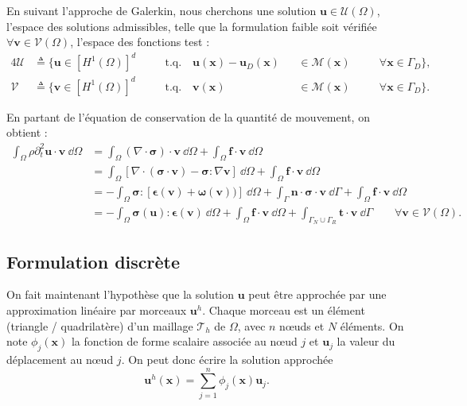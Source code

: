 \documentclass[12pt]{article}
\newcommand{\uu}{\mathbf{u}}
\newcommand{\vv}{\mathbf{v}}
\newcommand{\xx}{\mathbf{x}}
\newcommand{\stress}{\boldsymbol{\sigma}}
\newcommand{\strain}{\boldsymbol{\epsilon}}
\begin{document}
En suivant l'approche de Galerkin, nous cherchons une solution 
$\uu \in \mathcal{U}(\Omega)$, l'espace des solutions admissibles, 
telle que la formulation faible soit vérifiée 
$\forall \vv \in \mathcal{V}(\Omega)$, l’espace des fonctions test :
\begin{alignat}{4}
    \mathcal{U} &\triangleq \big\{ 
        \uu \in [H^1(\Omega)]^d \quad &&\text{t.q.} \quad 
        \uu(\xx) - \uu_D(\xx) &&\in \mathcal{M}(\xx) 
        \quad &&\forall \xx \in \Gamma_D
    \big\},\\
    \mathcal{V} &\triangleq \big\{ 
        \vv \in [H^1(\Omega)]^d \quad &&\text{t.q.} \quad 
        \vv(\xx) &&\in \mathcal{M}(\xx)
        \quad &&\forall \xx \in \Gamma_D
    \big\}.
\end{alignat}

En partant de l'équation de conservation de la quantité de mouvement, on
obtient :
\begin{equation}
    \begin{aligned}
        \int_\Omega \rho \partial^2_t \uu \cdot \vv \:\dd\Omega 
        &= 
        \int_\Omega (\nabla \cdot \stress) \cdot \vv \:\dd\Omega + 
        \int_\Omega \mathbf{f} \cdot \vv \:\dd\Omega\\
        &=
        \int_\Omega \left[\nabla \cdot (\stress \cdot \vv) 
        - \stress : \nabla \vv \right] \:\dd\Omega + 
        \int_\Omega \mathbf{f} \cdot \vv \:\dd\Omega\\
        &=
        -\int_\Omega \stress : \left[
            \strain(\vv) + \boldsymbol{\omega}(\vv))\right] \:\dd\Omega +
        \int_{\Gamma}  \mathbf{n} \cdot \stress \cdot \vv \:\dd\Gamma +
        \int_\Omega \mathbf{f} \cdot \vv \:\dd\Omega\\
        &= 
        -\int_\Omega \stress(\uu) : \strain(\vv) \:\dd\Omega +
        \int_\Omega \mathbf{f} \cdot \vv \:\dd\Omega +
        \int_{\Gamma_N \cup \Gamma_R}  \mathbf{t} \cdot \vv \:\dd\Gamma 
        \qquad \forall \vv \in \mathcal{V}(\Omega).
    \end{aligned}\label{eq:weak}
\end{equation}

\subsection{Formulation discrète}
On fait maintenant l'hypothèse que la solution $\uu$ peut être approchée par 
une approximation linéaire par morceaux $\uu^h$. Chaque morceau est un élément
(triangle / quadrilatère) d'un maillage $\mathcal{T}_h$ de $\Omega$, avec 
$n$ nœuds et $N$ éléments. On note $\phi_{j}(\xx)$ la fonction de
forme scalaire associée au n\oe ud $j$ et $\uu_j$ la valeur du 
déplacement au n\oe ud $j$. On peut donc écrire la solution approchée
\begin{equation}
    \uu^h(\xx) = \sum_{j=1}^{n} \phi_j(\xx) \uu_j.
\end{equation}
\end{document}
